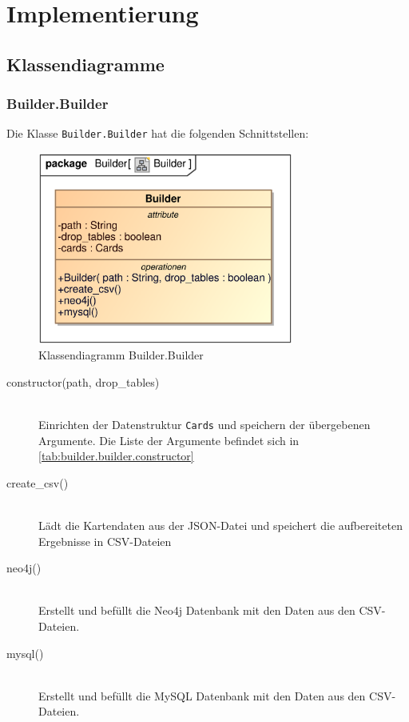 \section{Implementierung}\label{ch:implementierung}


\subsection{Klassendiagramme}

\subsubsection{Builder.Builder}
Die Klasse \verb|Builder.Builder| hat die folgenden Schnittstellen:

\begin{figure}[H]
    \myfloatalign
    \includegraphics[width=0.75\textwidth]{gfx/MtGDeepAnalysis/Builder.eps}
    \caption{Klassendiagramm Builder.Builder}
    \label{fig:class:builder.builder}
\end{figure}

\begin{description}
    \item[constructor(path, drop\_tables)] \hfill \\
    Einrichten der Datenstruktur \verb|Cards| und speichern der übergebenen Argumente. Die Liste der Argumente befindet sich in \autoref{tab:builder.builder.constructor}
    \item[create\_csv()] \hfill \\
    Lädt die Kartendaten aus der \ac{JSON}-Datei und speichert die aufbereiteten Ergebnisse in \ac{CSV}-Dateien
    \item[neo4j()] \hfill \\
    Erstellt und befüllt die Neo4j Datenbank mit den Daten aus den \ac{CSV}-Dateien.
    \item[mysql()] \hfill \\
    Erstellt und befüllt die MySQL Datenbank mit den Daten aus den \ac{CSV}-Dateien.
\end{description}

